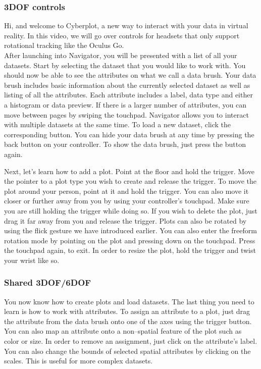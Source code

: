 \documentclass{article}
\begin{document}
\subsubsection{3DOF controls}

Hi, and welcome to Cyberplot, a new way to interact with your data in virtual reality. In this video, we will go over controls for headsets that only support rotational tracking like the Oculus Go.\\

After launching into Navigator, you will be presented with a list of all your datasets. Start by selecting the dataset that you would like to work with. You should now be able to see the attributes on what we call a data brush. Your data brush includes basic information about the currently selected dataset as well as listing of all the attributes. Each attribute includes a label, data type and either a histogram or data preview. If there is a larger number of attributes, you can move between pages by swiping the touchpad. Navigator allows you to interact with multiple datasets at the same time. To load a new dataset, click the corresponding button. You can hide your data brush at any time by pressing the back button on your controller. To show the data brush, just press the button again.\\

\newpage

Next, let's learn how to add a plot. Point at the floor and hold the trigger. Move the pointer to a plot type you wish to create and release the trigger. To move the plot around your person, point at it and hold the trigger. You can also move it closer or further away from you by using your controller's touchpad. Make sure you are still holding the trigger while doing so. If you wish to delete the plot, just drag it far away from you and release the trigger. Plots can also be rotated by using the flick gesture we have introduced earlier. You can also enter the freeform rotation mode by pointing on the plot and pressing down on the touchpad. Press the touchpad again, to exit. In order to resize the plot, hold the trigger and twist your wrist like so.

\subsubsection{Shared 3DOF/6DOF}

You now know how to create plots and load datasets. The last thing you need to learn is how to work with attributes. To assign an attribute to a plot, just drag the attribute from the data brush onto one of the axes using the trigger button. You can also map an attribute onto a non--spatial feature of the plot such as color or size. In order to remove an assignment, just click on the attribute's label. You can also change the bounds of selected spatial attributes by clicking on the scales. This is useful for more complex datasets.\\
\end{document}
